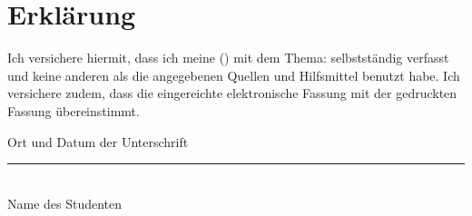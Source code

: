 
\thispagestyle{empty}

\section*{Erklärung}
\vspace*{2em}


Ich versichere hiermit, dass ich meine  () mit dem Thema: \textit{} selbstständig verfasst 
und keine anderen als die angegebenen Quellen und Hilfsmittel benutzt habe. Ich versichere 
zudem, dass die eingereichte elektronische Fassung mit der gedruckten Fassung übereinstimmt.

\vspace{3em}

{\color{red}Ort und Datum der Unterschrift}
\vspace{4em}

\rule{7cm}{0.4pt}\\
Name des Studenten
